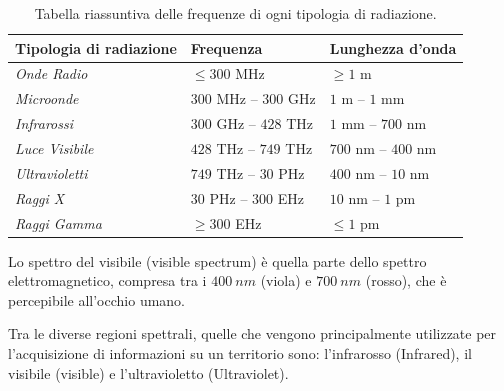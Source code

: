 \begin{table}[H]
    \centering
    \begin{tabular}{|p{5cm}|p{5cm}|p{5cm}|}
        \hline
        \textbf{Tipologia di radiazione} & \textbf{Frequenza} & \textbf{Lunghezza d’onda} \\
        \hline
        \textit{Onde Radio} & $\leq 300$ MHz & $\geq 1$ m \\
        \hline
        \textit{Microonde} & $300$ MHz – $300$ GHz & $1$ m – $1$ mm \\
        \hline
        \textit{Infrarossi} & $300$ GHz – $428$ THz & $1$ mm – $700$ nm \\
        \hline
        \textit{Luce Visibile} & $428$ THz – $749$ THz & $700$ nm – $400$ nm \\
        \hline
        \textit{Ultravioletti} & $749$ THz – $30$ PHz & $400$ nm – $10$ nm \\
        \hline
        \textit{Raggi X} & $30$ PHz – $300$ EHz & $10$ nm – $1$ pm \\
        \hline
        \textit{Raggi Gamma} & $\geq 300$ EHz & $\leq 1$ pm \\
        \hline
    \end{tabular}
    \caption{Tabella riassuntiva delle frequenze di ogni tipologia di radiazione.}
\end{table}

Lo spettro del visibile (visible spectrum) è quella parte dello spettro 
elettromagnetico, compresa tra i $400\ nm$ (viola) e $700\ nm$ (rosso), che è percepibile 
all’occhio umano.

Tra le diverse regioni spettrali, quelle che vengono principalmente utilizzate 
per l'acquisizione di informazioni su un territorio sono: l'infrarosso (Infrared), 
il visibile (visible) e l'ultravioletto (Ultraviolet). 



